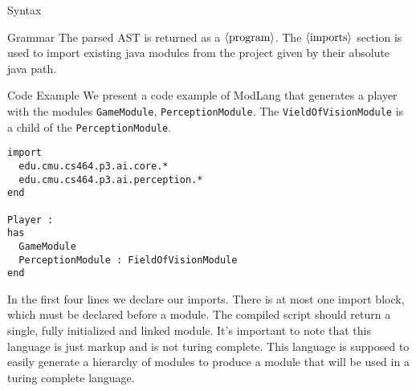 \documentclass[11pt]{article}
\newcommand\nonterm[1]{\langle\textnormal{#1}\rangle}
\begin{document}
\begin{section}{Syntax}
\begin{subsection}{Grammar}
The parsed AST is returned as a $\nonterm{program}$. The $\nonterm{imports}$ section is used to import existing java modules from the project given by their absolute java path.
\end{subsection}
\begin{subsection}{Code Example}
We present a code example of ModLang that generates a player with the modules \verb|GameModule|, \verb|PerceptionModule|. The \verb|VieldOfVisionModule| is a child of the \verb|PerceptionModule|.
\begin{verbatim}
import
  edu.cmu.cs464.p3.ai.core.*
  edu.cmu.cs464.p3.ai.perception.*
end

Player : 
has
  GameModule
  PerceptionModule : FieldOfVisionModule
end
\end{verbatim}
In the first four lines we declare our imports. There is at most one import block, which must be declared before a module. The compiled script should return a single, fully initialized and linked module. It's important 
to note that this language is just markup and is not turing complete. This language is supposed to easily generate a hierarchy of modules to produce a module that will be used in a turing complete language. 
\end{subsection}
\end{section}
\end{document}
